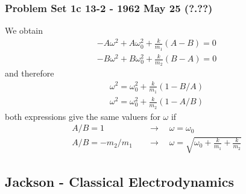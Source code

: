 \documentclass[10pt,a4paper]{article}
\theoremstyle{definition}
\begin{document}
\subsubsection{Problem Set 1c  13-2 - 1962 May 25 (?.??)}
We obtain
\begin{align}
-A\omega^2+A\omega_0^2+\frac{k}{m_1}(A-B)=0\\
-B\omega^2+B\omega_0^2+\frac{k}{m_2}(B-A)=0
\end{align}
and therefore
\begin{align}
\omega^2=\omega_0^2+\frac{k}{m_1}(1-B/A)\\
\omega^2=\omega_0^2+\frac{k}{m_2}(1-A/B)
\end{align}
both expressions give the same valuers for $\omega$ if
\begin{align}
A/B=1\quad&\rightarrow\quad \omega=\omega_0\\
A/B=-m_2/m_1\quad&\rightarrow\quad \omega=\sqrt{\omega_0+\frac{k}{m_1}+\frac{k}{m_2}}
\end{align} 

\subsection{{\sc Jackson} - Classical Electrodynamics}
\end{document}
